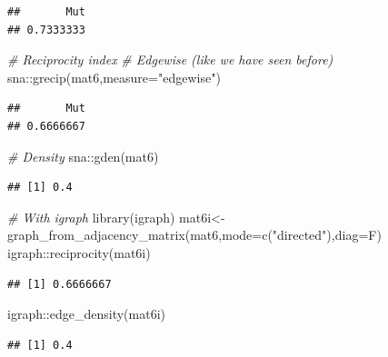 \documentclass[
  notitlepage,
  onecolumn,
  openany]{book}
\newenvironment{Shaded}{\begin{snugshade}}{\end{snugshade}}
\newcommand{\AttributeTok}[1]{\textcolor[rgb]{0.77,0.63,0.00}{#1}}
\newcommand{\CommentTok}[1]{\textcolor[rgb]{0.56,0.35,0.01}{\textit{#1}}}
\newcommand{\FunctionTok}[1]{\textcolor[rgb]{0.00,0.00,0.00}{#1}}
\newcommand{\NormalTok}[1]{#1}
\newcommand{\OtherTok}[1]{\textcolor[rgb]{0.56,0.35,0.01}{#1}}
\newcommand{\SpecialCharTok}[1]{\textcolor[rgb]{0.00,0.00,0.00}{#1}}
\newcommand{\StringTok}[1]{\textcolor[rgb]{0.31,0.60,0.02}{#1}}
\begin{document}
\begin{verbatim}
##       Mut 
## 0.7333333
\end{verbatim}

\begin{Shaded}
\begin{Highlighting}[]
\CommentTok{\# Reciprocity index}
\CommentTok{\# Edgewise (like we have seen before)}
\NormalTok{sna}\SpecialCharTok{::}\FunctionTok{grecip}\NormalTok{(mat6,}\AttributeTok{measure=}\StringTok{"edgewise"}\NormalTok{)}
\end{Highlighting}
\end{Shaded}

\begin{verbatim}
##       Mut 
## 0.6666667
\end{verbatim}

\begin{Shaded}
\begin{Highlighting}[]
\CommentTok{\# Density}
\NormalTok{sna}\SpecialCharTok{::}\FunctionTok{gden}\NormalTok{(mat6)}
\end{Highlighting}
\end{Shaded}

\begin{verbatim}
## [1] 0.4
\end{verbatim}

\begin{Shaded}
\begin{Highlighting}[]
\CommentTok{\# With igraph}
\FunctionTok{library}\NormalTok{(igraph)}
\NormalTok{mat6i}\OtherTok{\textless{}{-}}\FunctionTok{graph\_from\_adjacency\_matrix}\NormalTok{(mat6,}\AttributeTok{mode=}\FunctionTok{c}\NormalTok{(}\StringTok{"directed"}\NormalTok{),}\AttributeTok{diag=}\NormalTok{F)}
\NormalTok{igraph}\SpecialCharTok{::}\FunctionTok{reciprocity}\NormalTok{(mat6i)}
\end{Highlighting}
\end{Shaded}

\begin{verbatim}
## [1] 0.6666667
\end{verbatim}

\begin{Shaded}
\begin{Highlighting}[]
\NormalTok{igraph}\SpecialCharTok{::}\FunctionTok{edge\_density}\NormalTok{(mat6i)}
\end{Highlighting}
\end{Shaded}

\begin{verbatim}
## [1] 0.4
\end{verbatim}
\end{document}

